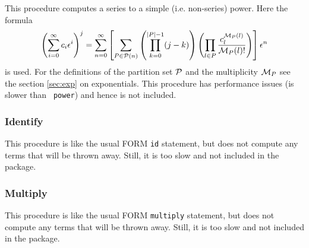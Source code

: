 \documentclass{article}
\begin{document}
This procedure computes a series to a simple
(i.e. non-series) power. Here the formula
\begin{equation}
  \label{eq:simpl_pow}
  \left(\sum_{i=0}^{\infty}c_i \epsilon^i\right)^j = \sum_{n=0}^\infty
  \left[\sum_{P \in {\cal P}(n)}\left(\prod_{k=0}^{|P|-1}
    (j-k)\right)\left(\prod_{l \in P} \frac{c^{{\cal M}_P(l)}_l}{{\cal M}_P(l)!} \right)\right]\epsilon^n
\end{equation}
is used. For the definitions of the partition set ${\cal P}$ and the
multiplicity ${\cal M}_P$ see the section \ref{sec:exp} on
exponentials. This procedure has performance issues (is slower than {\tt
  power}) and hence is not included.

\subsubsection{Identify}
\label{sec:impl_id}

This procedure is like the usual FORM {\tt id} statement, but does not
compute any terms that will be thrown away. Still, it is too slow and
not included in the package.


\subsubsection{Multiply}
\label{sec:impl_multi}

This procedure is like the usual FORM {\tt multiply} statement, but does not
compute any terms that will be thrown away. Still, it is too slow and
not included in the package.
\end{document}
